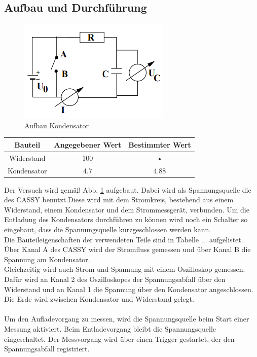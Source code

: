 \documentclass[12pt,a4paper]{article}
\begin{document}
\subsection{Aufbau und Durchführung}
\begin{figure}[H]
\begin{center}
\includegraphics[width=0.75\linewidth]{Bilder/Kondensator_Aufbau}
\caption[Aufbau Kondensator]{Aufbau Kondensator}
\label{fig:Kond_Aufbau}
\end{center}
\end{figure}

\begin{tabular}{|c|c|c|}
\hline 
Bauteil & Angegebener Wert & Bestimmter Wert \\ 
\hline 
Widerstand & 100 & • \\ 
\hline 
Kondensator & 4.7 & 4.88 \\ 
\hline 
\end{tabular} 

Der Versuch wird gemäß Abb. \ref{fig:Kond_Aufbau} aufgebaut. Dabei wird als Spannungsquelle die des CASSY benutzt.Diese wird mit dem Stromkreis, bestehend aus einem Widerstand, einem Kondensator und dem Strommessgerät, verbunden. Um die Entladung des Kondensators durchführen zu können wird noch ein Schalter so eingebaut, dass die Spannungsquelle kurzgeschlossen werden kann.\\ 
Die Bauteileigenschaften  der verwendeten Teile sind in Tabelle ... aufgelistet.
Über Kanal A des CASSY wird der Stromfluss gemessen und über Kanal B die Spannung am Kondensator.\\
Gleichzeitig wird auch Strom und Spannung mit einem Oszilloskop gemessen. Dafür wird an Kanal 2 des Oszilloskopes der Spannungsabfall über den Widerstand und an Kanal 1 die Spannung über den Kondensator angeschlossen. Die Erde wird zwischen Kondensator und Widerstand gelegt.\\
\\
Um den Aufladevorgang zu messen, wird die Spannungsquelle beim Start einer Messung aktiviert.
Beim Entladevorgang bleibt die Spannungsquelle eingeschaltet. Der Messvorgang wird über einen Trigger gestartet, der den Spannungsabfall registriert.
\end{document}

